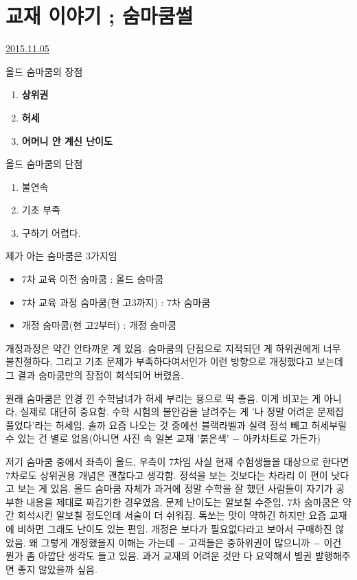 




\section{교재 이야기 ; 숨마쿰썰}
\href{https://www.kockoc.com/Apoc/464449}{2015.11.05}

\vspace{5mm}

올드 숨마쿰의 장점

\begin{enumerate}
    \item \textbf{상위권}
    \item \textbf{ 허세}
    \item \textbf{ 어머니 안 계신 난이도}
\end{enumerate}
\vspace{5mm}

올드 숨마쿰의 단점
\begin{enumerate}
    \item 불연속
    \item 기초 부족
    \item 구하기 어렵다.
\end{enumerate}
\vspace{5mm}

제가 아는 숨마쿰은 3가지임
\begin{itemize}
    \item 7차 교육 이전 숨마쿰 : 올드 숨마쿰
    \item 7차 교육 과정 숨마쿰(현 고3까지) : 7차 숨마쿰
    \item 개정 숨마쿰(현 고2부터) : 개정 숨마쿰
\end{itemize}
\vspace{5mm}

개정과정은 약간 안타까운 게 있음.
숨마쿰의 단점으로 지적되던 게 하위권에게 너무 불친절하다, 그리고 기초 문제가 부족하다여서인가
이런 방향으로 개정했다고 보는데 그 결과 숨마쿰만의 장점이 희석되어 버렸음.
\vspace{5mm}

원래 숨마쿰은 안경 낀 수학남녀가 허세 부리는 용으로 딱 좋음.
이게 비꼬는 게 아니라, 실제로 대단히 중요함. 수학 시험의 불안감을 날려주는 게 '나 정말 어려운 문제집 풀었다'라는 허세임.
솔까 요즘 나오는 것 중에선 블랙라벨과 실력 정석 빼고 허세부릴 수 있는 건 별로 없음(아니면 사진 속 일본 교재 '붉은색' $-$ 아카차트로 가든가)
\vspace{5mm}

저기 숨마쿰 중에서 좌측이 올드, 우측이 7차임
사실 현재 수험생들을 대상으로 한다면 7차로도 상위권용 개념은 괜찮다고 생각함.
정석을 보는 것보다는 차라리 이 편이 낫다고 보는 게 있음.
올드 숨마쿰 자체가 과거에 정말 수학을 잘 했던 사람들이 자기가 공부한 내용을 제대로 짜깁기한 경우였음.
문제 난이도는 알보칠 수준임.
7차 숨마쿰은 약간 희석시킨 알보칠 정도인데 서술이 더 쉬워짐. 톡쏘는 맛이 약하긴 하지만 요즘 교재에 비하면 그래도 난이도 있는 편임.
개정은 보다가 필요없다라고 보아서 구매하진 않았음. 왜 그렇게 개정했을지 이해는 가는데 $-$ 고객들은 중하위권이 많으니까 $-$
이건 뭔가 좀 아깝단 생각도 들고 있음. 과거 교재의 어려운 것만 다 요약해서 별권 발행해주면 좋지 않았을까 싶음.
\vspace{5mm}

